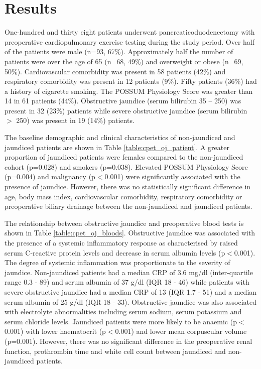 \section{Results}
One-hundred and thirty eight patients underwent pancreaticoduodenectomy with preoperative cardiopulmonary exercise testing during the study period. Over half of the patients were male (n=93, 67\%). Approximately half the number of patients were over the age of 65 (n=68, 49\%) and overweight or obese (n=69, 50\%). Cardiovascular comorbidity was present in 58 patients (42\%) and respiratory comorbidity was present in 12 patients (9\%). Fifty patients (36\%) had a history of cigarette smoking. The POSSUM Physiology Score was greater than 14 in 61 patients (44\%). Obstructive jaundice (serum bilirubin 35 – 250) was present in 32 (23\%) patients while severe obstructive jaundice (serum bilirubin $>$ 250) was present in 19 (14\%) patients. 

The baseline demographic and clinical characteristics of non-jaundiced and jaundiced patients are shown in Table \ref{table:cpet_oj_patient}. A greater proportion of jaundiced patients were females compared to the non-jaundiced cohort (p=0.028) and smokers (p=0.038). Elevated POSSUM Physiology Score (p=0.004) and malignancy (p$<$0.001) were significantly associated with the presence of jaundice. However, there was no statistically significant difference in age, body mass index, cardiovascular comorbidity, respiratory comorbidity or preoperative biliary drainage between the non-jaundiced and jaundiced patients.



The relationship between obstructive jaundice and preoperative blood tests is shown in Table \ref{table:cpet_oj_bloods}. Obstructive jaundice was associated with the presence of a systemic inflammatory response as characterised by raised serum C-reactive protein levels and decrease in serum albumin levels (p$<$0.001). The degree of systemic inflammation was proportionate to the severity of jaundice. Non-jaundiced patients had a median CRP of 3.6 mg/dl (inter-quartile range 0.3 - 89) and serum albumin of 37 g/dl (IQR 18 - 46) while patients with severe obstructive jaundice had a median CRP of 13 (IQR 1.7 - 51) and a median serum albumin of 25 g/dl (IQR 18 - 33). Obstructive jaundice was also associated with electrolyte abnormalities including serum sodium, serum potassium and serum chloride levels. Jaundiced patients were more likely to be anaemic (p$<$0.001) with lower haematocrit (p$<$0.001) and lower mean corpuscular volume (p=0.001). However, there was no significant difference in the preoperative renal function, prothrombin time and white cell count between jaundiced and non-jaundiced patients. 

